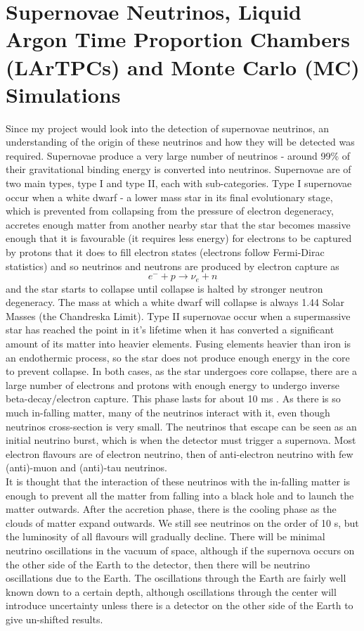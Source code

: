 \documentclass[a4paper,12,oneside,notitlepage]{report}
\begin{document}
\section*{\fontsize{11}{11}\selectfont Supernovae Neutrinos, Liquid Argon Time Proportion Chambers (LArTPCs) and Monte Carlo (MC) Simulations }
Since my project would look into the detection of supernovae neutrinos, an understanding of the origin of these neutrinos and how they will be detected was required. Supernovae produce a very large number of neutrinos - around 99\% of their gravitational binding energy is converted into neutrinos. Supernovae are of two main types, type I and type II, each with sub-categories. Type I supernovae occur when a white dwarf - a lower mass star in its final evolutionary stage, which is prevented from collapsing from the pressure of electron degeneracy, accretes enough matter from another nearby star that the star becomes massive enough that it is favourable (it requires less energy) for electrons to be captured by protons that it does to fill electron states (electrons follow Fermi-Dirac statistics) and so neutrinos and neutrons are produced by electron capture as
$$e^- + p \rightarrow \nu_e + n$$
and the star starts to collapse until collapse is halted by stronger neutron degeneracy. The mass at which a white dwarf will collapse is always 1.44 Solar Masses (the Chandreska Limit). Type II supernovae occur when a supermassive star has reached the point in it's lifetime when it has converted a significant amount of its matter into heavier elements. Fusing elements heavier than iron is an endothermic process, so the star does not produce enough energy in the core to prevent collapse. In both cases, as the star undergoes core collapse, there are a large number of electrons and protons with enough energy to undergo inverse beta-decay/electron capture. This phase lasts for about 10 ms \cite{Scholberg}. As there is so much in-falling matter, many of the neutrinos interact with it, even though neutrinos cross-section is very small. The neutrinos that escape can be seen as an initial neutrino burst, which is when the detector must trigger a supernova. Most electron flavours are of electron neutrino, then of anti-electron neutrino with few (anti)-muon and (anti)-tau neutrinos.
\vspace{0.5cm}
\\It is thought that the interaction of these neutrinos with the in-falling matter is enough to prevent all the matter from falling into a black hole and to launch the matter outwards. After the accretion phase, there is the cooling phase as the clouds of matter expand outwards. We still see neutrinos on the order of 10 s, but the luminosity of all flavours will gradually decline. There will be minimal neutrino oscillations in the vacuum of space, although if the supernova occurs on the other side of the Earth to the detector, then there will be neutrino oscillations due to the Earth. The oscillations through the Earth are fairly well known down to a certain depth, although oscillations through the center will introduce uncertainty unless there is a detector on the other side of the Earth to give un-shifted results. 
\end{document}
